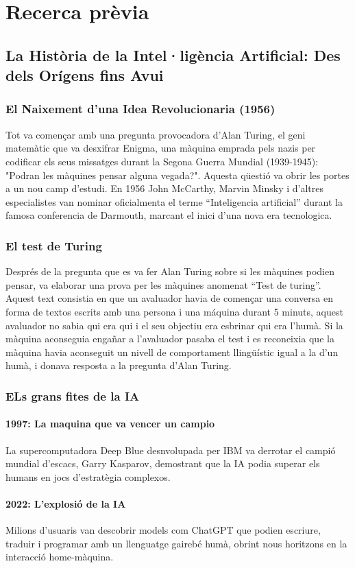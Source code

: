 \chapter{Recerca prèvia}
\label{c:intro}
\section{La Història de la Intel·ligència Artificial: Des dels Orígens fins Avui}
\subsection{El Naixement d'una Idea Revolucionaria (1956)}
Tot va començar amb una pregunta provocadora d’Alan Turing, el geni matemàtic que va desxifrar Enigma, una màquina emprada pels nazis per codificar els seus missatges durant la Segona Guerra Mundial (1939-1945): "Podran les màquines pensar alguna vegada?". Aquesta qüestió va obrir les portes a un nou camp d’estudi. En 1956 John McCarthy, Marvin Minsky i d'altres especialistes van nominar oficialmenta el terme ``Inteligencia artificial'' durant la famosa conferencia de Darmouth, marcant el inici d'una nova era tecnologica.
\subsection{El test de Turing}
Després de la pregunta que es va fer Alan Turing sobre si les màquines podien pensar, va elaborar una prova per les màquines anomenat ``Test de turing''. Aquest text consistia en que un avaluador havia de començar una conversa en forma de textos escrits amb una persona i una máquina durant 5 minuts, aquest avaluador no sabia qui era qui i el seu objectiu era esbrinar qui era l'humà. Si la màquina aconseguia engañar a l'avaluador pasaba el test i es reconeixia que la màquina havia aconseguit un nivell de comportament llingüístic igual a la d'un humà, i donava resposta a la pregunta d'Alan Turing.
\subsection{ELs grans fites de la IA}
\subsubsection{1997: La maquina que va vencer un campio}
 La supercomputadora Deep Blue desnvolupada per IBM va derrotar el campió mundial d’escacs, Garry Kasparov, demostrant que la IA podia superar els humans en jocs d’estratègia complexos.
\subsubsection{2022: L'explosió de la IA}
Milions d’usuaris van descobrir models com ChatGPT que podien escriure, traduir i programar amb un llenguatge gairebé humà, obrint nous horitzons en la interacció home-màquina.
